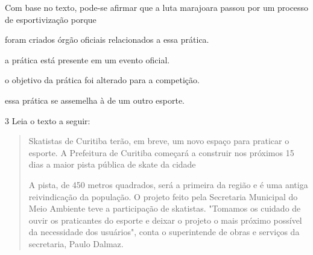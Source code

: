 Com base no texto, pode-se afirmar que a luta marajoara passou
por um processo de esportivização porque

\begin{escolha}
\item foram criados órgão oficiais relacionados a essa prática.

\item a prática está presente em um evento oficial.

\item o objetivo da prática foi alterado para a competição.

\item essa prática se assemelha à de um outro esporte.
\end{escolha}


\num{3} Leia o texto a seguir:

\begin{quote}
Skatistas de Curitiba terão, em breve, um novo espaço para praticar o
esporte. A Prefeitura de Curitiba começará a construir nos próximos 15
dias a maior pista pública de skate da cidade 

A pista, de 450 metros quadrados, será a primeira da região e é uma antiga 
reivindicação da população. O projeto feito pela Secretaria Municipal do 
Meio Ambiente teve a participação de skatistas. "Tomamos os cuidado de 
ouvir os praticantes do esporte e deixar o projeto o mais próximo possível 
da necessidade dos usuários", conta o superintende de obras e serviços da 
secretaria, Paulo Dalmaz.


\end{quote}

